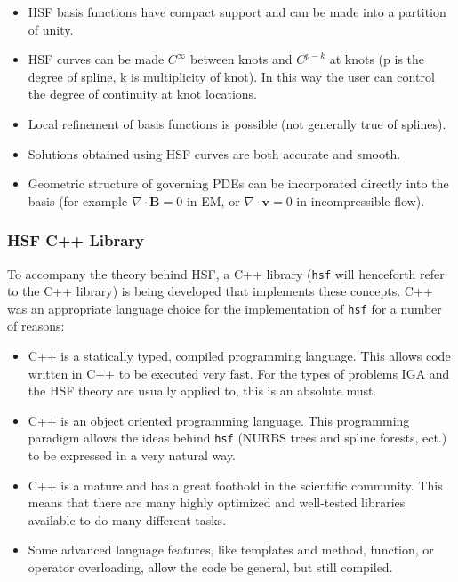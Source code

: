     \begin{itemize}
      \item HSF basis functions have compact support and can be made into a partition of unity.
      \item HSF curves can be made $C^{\infty}$ between knots and $C^{p-k}$ at knots (p is the degree of spline, k is multiplicity of knot). In this way the user can control the degree of continuity at knot locations.
      \item Local refinement of basis functions is possible (not generally true of splines).
      \item Solutions obtained using HSF curves are both accurate and smooth.
      \item Geometric structure of governing PDEs can be incorporated directly into the basis (for example $\nabla\cdot\mathbf{B} = 0$ in EM, or $\nabla\cdot\mathbf{v} = 0$ in incompressible flow).
    \end{itemize}
    \mainstretch{}

    \subsubsection{HSF C++ Library} \label{ssub:hsfpy_cpp_library}

    To accompany the theory behind HSF, a C++ library (\texttt{hsf} will henceforth refer to the C++ library) is being developed that implements these concepts. C++ was an appropriate language choice for the implementation of \texttt{hsf} for a number of reasons:

    \begin{itemize}
      \item C++ is a statically typed, compiled programming language. This allows code written in C++ to be executed very fast. For the types of problems IGA and the HSF theory are usually applied to, this is an absolute must.
      \item C++ is an object oriented programming language. This programming paradigm allows the ideas behind \texttt{hsf} (NURBS trees and spline forests, ect.) to be expressed in a very natural way.
      \item C++ is a mature and has a great foothold in the scientific community. This means that there are many highly optimized and well-tested libraries available to do many different tasks.
      \item Some advanced language features, like templates and method, function, or operator overloading, allow the code be general, but still compiled.
    \end{itemize}
    \mainstretch{}

